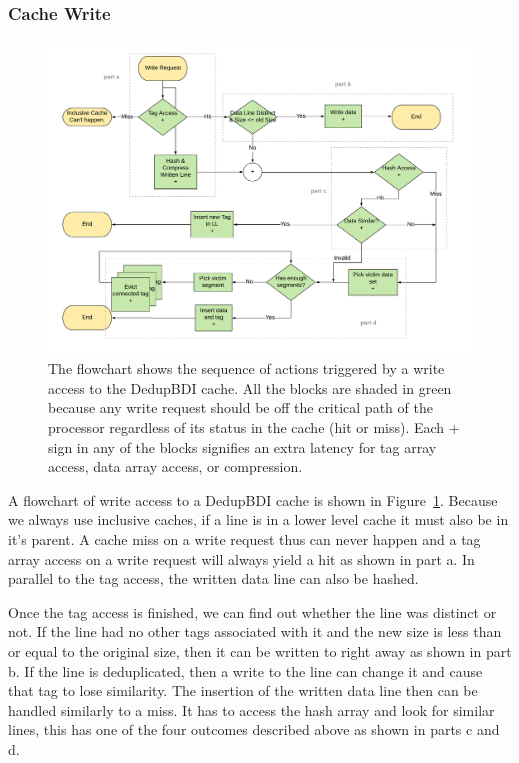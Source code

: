 \subsubsection{Cache Write}
\begin{figure}
    \includegraphics[width=\textwidth]{DedupBDI_Write.pdf}
    \caption[DedupBDI Write]{The flowchart shows the sequence of actions triggered by a write access to the DedupBDI cache. All the blocks are shaded in green because any write request should be off the critical path of the processor regardless of its status in the cache (hit or miss). Each + sign in any of the blocks signifies an extra latency for tag array access, data array access, or compression.}
    \label{fig:DedupBDI_Write}
\end{figure}
A flowchart of write access to a DedupBDI cache is shown in Figure~\ref{fig:DedupBDI_Write}. Because we always use inclusive caches, if a line is in a lower level cache it must also be in it's parent. A cache miss on a write request thus can never happen and a tag array access on a write request will always yield a hit as shown in part a. In parallel to the tag access, the written data line can also be hashed.\par
Once the tag access is finished, we can find out whether the line was distinct or not. If the line had no other tags associated with it and the new size is less than or equal to the original size, then it can be written to right away as shown in part b. If the line is deduplicated, then a write to the line can change it and cause that tag to lose similarity. The insertion of the written data line then can be handled similarly to a miss. It has to access the hash array and look for similar lines, this has one of the four outcomes described above as shown in parts c and d.

